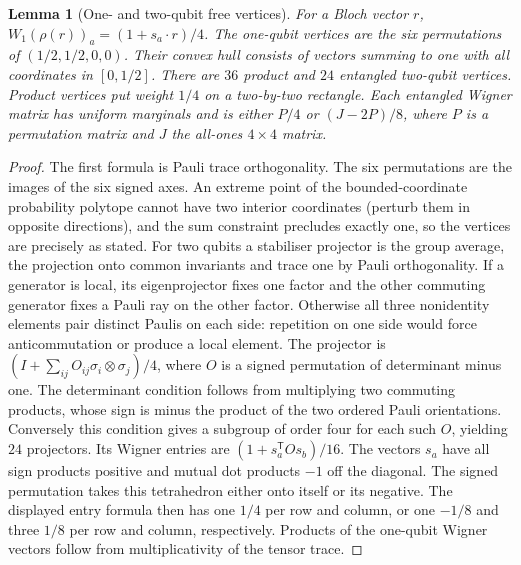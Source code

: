 \documentclass[aps,pra,onecolumn,superscriptaddress,nofootinbib,10pt]{revtex4-2}
\newtheorem{lemma}[theorem]{Lemma}
\theoremstyle{definition}
\theoremstyle{remark}
\begin{document}
\begin{lemma}[One- and two-qubit free vertices]\label{ob:wignervertices}
For a Bloch vector \(r\), \(W_1(\rho(r))_a=(1+s_a\cdot r)/4\).
The one-qubit vertices are the six permutations of
\((1/2,1/2,0,0)\). Their convex hull consists of vectors summing to
one with all coordinates in \([0,1/2]\). There are \(36\) product
and \(24\) entangled two-qubit vertices. Product vertices put
weight \(1/4\) on a two-by-two rectangle. Each entangled Wigner
matrix has uniform marginals and is either \(P/4\) or
\((J-2P)/8\), where \(P\) is a permutation matrix and \(J\)
the all-ones \(4\times4\) matrix.
\end{lemma}
\begin{proof}
The first formula is Pauli trace orthogonality. The six permutations
are the images of the six signed axes. An extreme point of the
bounded-coordinate probability polytope cannot have two interior
coordinates (perturb them in opposite directions), and the sum
constraint precludes exactly one, so the vertices are precisely as
stated. For two qubits a stabiliser projector is the group average,
the projection onto common invariants and trace one by Pauli
orthogonality. If a generator is local, its eigenprojector fixes
one factor and the other commuting generator fixes a Pauli ray on
the other factor. Otherwise all three nonidentity elements pair
distinct Paulis on each side: repetition on one side would force
anticommutation or produce a local element. The projector is
\((I+\sum_{ij}O_{ij}\sigma_i\otimes\sigma_j)/4\), where \(O\)
is a signed permutation of determinant minus one. The determinant
condition follows from multiplying two commuting products, whose
sign is minus the product of the two ordered Pauli orientations.
Conversely this condition gives a subgroup of order four for each
such \(O\), yielding \(24\) projectors. Its Wigner entries are
\((1+s_a^{\mathsf T}O s_b)/16\). The vectors \(s_a\) have all sign
products positive and mutual dot products \(-1\) off the diagonal.
The signed permutation takes this tetrahedron either onto itself or
its negative. The displayed entry formula then has one \(1/4\)
per row and column, or one \(-1/8\) and three \(1/8\) per row
and column, respectively. Products of the one-qubit Wigner vectors
follow from multiplicativity of the tensor trace.
\end{proof}
\end{document}

